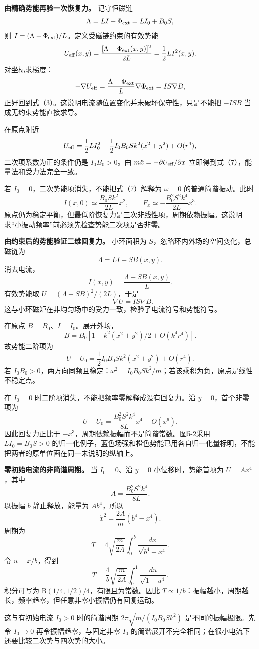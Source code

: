 \documentclass[12pt,a4paper,UTF8]{ctexart}
\begin{document}
\textbf{由精确势能再验一次恢复力。} 记守恒磁链 \[
\Lambda=LI+\Phi_{\rm ext}=LI_0+B_0S,
\] 则 \(I=(\Lambda-\Phi_{\rm ext})/L\)。定义受磁链约束的有效势能 \[
U_{\rm eff}(x,y)
=\frac{[\Lambda-\Phi_{\rm ext}(x,y)]^2}{2L}
=\frac12LI^2(x,y).
\] 对坐标求梯度： \[
-\nabla U_{\rm eff}
=\frac{\Lambda-\Phi_{\rm ext}}L\nabla\Phi_{\rm ext}
=IS\nabla B,
\] 正好回到式（3）。这说明电流随位置变化并未破坏保守性，只是不能把
\(-ISB\) 当成无约束势能直接求导。

在原点附近 \[
U_{\rm eff}
=\frac12LI_0^2+
\frac12I_0B_0Sk^2(x^2+y^2)+O(r^4),
\] 二次项系数为正的条件仍是 \(I_0B_0>0\)。由
\(m\ddot x=-\partial U_{\rm eff}/\partial x\)
立即得到式（7），能量法和受力法完全一致。

若 \(I_0=0\)，二次势能项消失，不能把式（7）解释为 \(\omega=0\)
的普通简谐振动。此时 \[
I(x,0)\simeq\frac{B_0Sk^2}{2L}x^2,
\qquad
F_x\simeq-\frac{B_0^2S^2k^4}{2L}x^3.
\]
原点仍为稳定平衡，但最低阶恢复力是三次非线性项，周期依赖振幅。这说明求``小振动频率''前必须先检查势能二次项是否非零。

\textbf{由约束后的势能验证二维回复力。} 小环面积为
\(S\)，忽略环内外场的空间变化，总磁链为 \[
\Lambda=LI+SB(x,y).
\] 消去电流， \[
I(x,y)=\frac{\Lambda-SB(x,y)}L.
\] 有效势能取 \(U=(\Lambda-SB)^2/(2L)\)，于是 \[
-\nabla U=IS\nabla B.
\] 这与小环磁矩在非均匀场中的受力一致，检验了电流符号和势能符号。

在原点 \(B=B_0\)、\(I=I_0\)。展开外场， \[
B=B_0[1-k^2(x^2+y^2)/2+O(k^4r^4)].
\] 故势能二阶项为 \[
U-U_0=\frac12I_0B_0Sk^2(x^2+y^2)+O(r^4).
\] 若
\(I_0B_0>0\)，两方向同频且稳定：\(\omega^2=I_0B_0Sk^2/m\)；若该乘积为负，原点是线性不稳定点。

在 \(I_0=0\) 时二阶项消失，不能把频率零解释成没有回复力。沿
\(y=0\)，首个非零项为 \[
U-U_0=\frac{B_0^2S^2k^4}{8L}x^4+O(x^6).
\] 因此回复力正比于 \(-x^3\)，周期依赖振幅而不是简谐常数。图5-2采用
\(LI_0=B_0S>0\)
的归一化例子，蓝色场强和橙色势能已用各自归一化量标明，不能把两者的原单位画在同一未说明的纵轴上。

\textbf{零初始电流的非简谐周期。} 当 \(I_0=0\)、沿 \(y=0\)
小位移时，势能首项为 \(U=Ax^4\)，其中 \[
A=\frac{B_0^2S^2k^4}{8L}.
\] 以振幅 \(b\) 静止释放，能量为 \(Ab^4\)，所以 \[
\dot x^2=\frac{2A}{m}(b^4-x^4).
\] 周期为 \[
T=4\sqrt{\frac m{2A}}\int_0^b\frac{dx}{\sqrt{b^4-x^4}}.
\] 令 \(u=x/b\)，得到 \[
T=\frac4b\sqrt{\frac m{2A}}\int_0^1\frac{du}{\sqrt{1-u^4}}.
\] 积分可写为 \(\mathrm B(1/4,1/2)/4\)，有限且为常数。因此
\(T\propto1/b\)：振幅越小，周期越长，频率趋零，但任意非零小振幅仍有回复运动。

这与有初始电流 \(I_0>0\) 时的简谐周期 \(2\pi\sqrt{m/(I_0B_0Sk^2)}\)
是不同的振幅极限。先令 \(I_0\to0\) 再令振幅趋零，与固定非零 \(I_0\)
的简谐展开不完全相同；在很小电流下还要比较二次势与四次势的大小。
\end{document}
